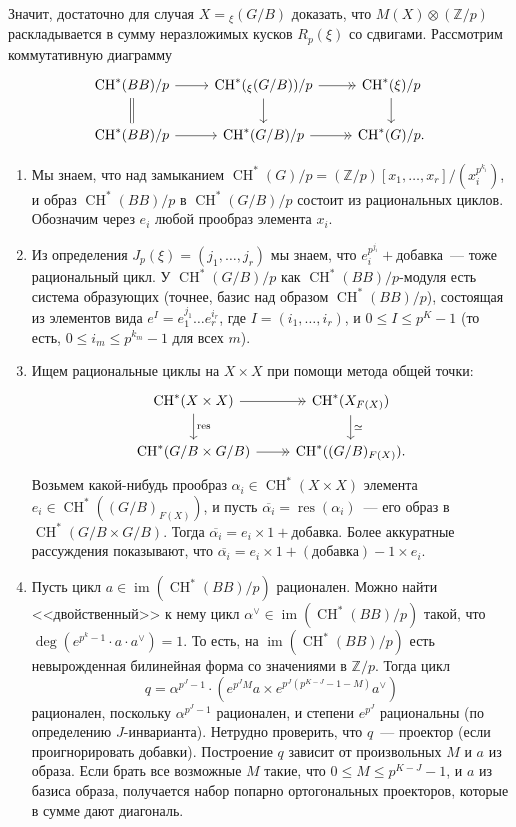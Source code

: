 \documentclass[a4paper]{article}
\DeclareMathOperator{\im}{im}
\DeclareMathOperator{\CH}{CH}
\DeclareMathOperator{\res}{res}
\newcommand{\isom}{\simeq}
\theoremstyle{definition}
\newcommand{\ol}{\overline}
\begin{document}
Значит, достаточно для случая $X = {}_{\xi}(G/B)$ доказать,
что $M(X)\otimes(\mathbb{Z}/p)$ раскладывается в сумму
неразложимых кусков $R_p(\xi)$ со сдвигами.
Рассмотрим коммутативную диаграмму
\[
\begin{tikzcd}
\CH^*(BB)/p \arrow{r} \arrow[equal]{d}
& \CH^*({}_{\xi}(G/B))/p \arrow[->>]{r} \arrow{d}
& \CH^*(\xi)/p \arrow{d} \\
\CH^*(BB)/p \arrow{r}
& \CH^*(G/B)/p \arrow[->>]{r}
& \CH^*(G)/p.
\end{tikzcd}
\]
\begin{enumerate}
\item
Мы знаем, что над замыканием
$\CH^*(G)/p = (\mathbb{Z}/p)[x_1,\dots,x_r] / (x_i^{p^{k_i}})$,
и образ $\CH^*(BB)/p$ в $\CH^*(G/B)/p$
состоит из рациональных циклов.
Обозначим через $e_i$ любой прообраз элемента $x_i$.
\item Из определения $J_p(\xi) = (j_1,\dots,j_r)$ мы знаем,
что $e_i^{p^{j_i}} + \mbox{добавка}$~--- тоже рациональный цикл.
У $\CH^*(G/B)/p$ как $\CH^*(BB)/p$-модуля есть система образующих
(точнее, базис над образом $\CH^*(BB)/p$), состоящая
из элементов вида $e^I=e_1^{j_1}\dots e_r^{i_r}$,
где $I = (i_1,\dots,i_r)$, и $0\leq I \leq p^K-1$
(то есть, $0\leq i_m \leq p^{k_m}-1$ для всех $m$).
\item Ищем рациональные циклы на $X\times X$ при помощи
метода общей точки:
\[
\begin{tikzcd}
\CH^*(X\times X) \arrow[->>]{r} \arrow{d}{\res}
& \CH^*(X_{F(X)}) \arrow{d}{\isom} \\
\CH^*(G/B\times G/B) \arrow[->>]{r}
& \CH^*((G/B)_{F(X)}).
\end{tikzcd}
\]
Возьмем какой-нибудь прообраз $\alpha_i\in\CH^*(X\times X)$
элемента $e_i\in\CH^*((G/B)_{F(X)})$,
и пусть $\ol{\alpha_i} = \res(\alpha_i)$~--- его образ
в $\CH^*(G/B\times G/B)$.
Тогда $\ol{\alpha_i} = e_i \times 1 + \mbox{добавка}$.
Более аккуратные рассуждения показывают, что
$\ol{\alpha_i} = e_i \times 1 + (\mbox{добавка}) - 1\times e_i$.
\item Пусть цикл $a\in\im(\CH^*(BB)/p)$ рационален.
Можно найти <<двойственный>> к нему
цикл $\alpha^{\vee} \in\im(\CH^*(BB)/p)$ такой, что
$\deg(e^{p^k-1}\cdot a \cdot a^{\vee}) = 1$.
То есть, на  $\im(\CH^*(BB)/p)$ есть невырожденная билинейная
форма со значениями в $\mathbb Z/p$.
Тогда цикл
\[
q = \alpha^{p^J-1} \cdot
\left(e^{p^JM}a\times e^{p^J(p^{K-J}-1-M)}a^\vee\right)
\]
рационален, поскольку $\alpha^{p^J-1}$ рационален,
и степени $e^{p^J}$ рациональны (по определению
$J$-инварианта).
Нетрудно проверить, что $q$~--- проектор
(если проигнорировать добавки).
Построение $q$ зависит от произвольных $M$ и $a$ из образа.
Если брать все возможные $M$ такие, что $0\leq M \leq p^{K-J}-1$,
и $a$ из базиса образа, получается
набор попарно ортогональных проекторов, которые в сумме
дают диагональ.


\end{enumerate}
\end{document}
